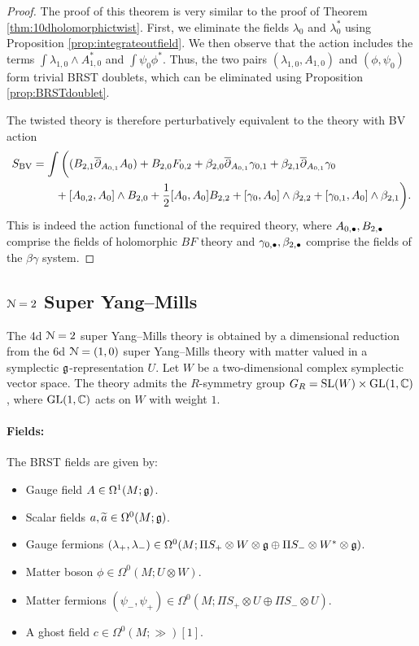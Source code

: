 \documentclass[10pt, oneside]{article}
\begin{document}
\begin{proof}
The proof of this theorem is very similar to the proof of Theorem \ref{thm:10dholomorphictwist}.  
First, we eliminate the fields $\lambda_0$ and $\lambda_0^*$ using Proposition \ref{prop:integrateoutfield}.  
We then observe that the action includes the terms $\int \lambda_{1,0} \wedge A_{1,0}^*$ and  $\int \psi_0\phi^*$. Thus, the two pairs $(\lambda_{1,0}, A_{1,0})$ and $(\phi, \psi_0)$ form trivial BRST doublets, which can be eliminated using Proposition \ref{prop:BRSTdoublet}.

The twisted theory is therefore perturbatively equivalent to the theory with BV action 
\begin{align*}
 S_{\mathrm{BV}} &= \int \bigg( (B_{2,1} \overline{\partial}_{A_{0,1}} A_{0})  + B_{2,0} F_{0,2} + \beta_{2,0} \overline{\partial}_{A_{0,1}} \gamma_{0,1} + \beta_{2,1} \overline{\partial}_{A_{0,1}} \gamma_0 \\ 
  &\qquad  + [A_{0,2}, A_0]\wedge B_{2,0} + \frac{1}{2}[A_0, A_0]B_{2,2} +  [\gamma_0, A_0]\wedge \beta_{2,2} + [\gamma_{0,1}, A_0]\wedge \beta_{2,1}  \bigg).
\end{align*}
This is indeed the action functional of the required theory, where $A_{0,\bullet}, B_{2,\bullet}$ comprise the fields of holomorphic $BF$ theory and $\gamma_{0,\bullet}, \beta_{2,\bullet}$ comprise the fields of the $\beta\gamma$ system.
\end{proof}

\subsection{\texorpdfstring{$\mathcal N=2$}{N=2} Super Yang--Mills} \label{4d_2_section}

The 4d $\mathcal N=2$ super Yang--Mills theory is obtained by a dimensional reduction from the 6d $\mathcal N=(1, 0)$ super Yang--Mills theory with matter valued in a symplectic $\mathfrak g$-representation $U$. Let $W$ be a two-dimensional complex symplectic vector space. The theory admits the $R$-symmetry group $G_R=\mathrm{SL}(W)\times \mathrm{GL}(1, \mathbb C)$, where $\mathrm{GL}(1, \mathbb C)$ acts on $W$ with weight $1$.

\vspace{-10pt}
\paragraph{Fields:} The BRST fields are given by:
\begin{itemize}
\item Gauge field $A \in \Omega^1(M; \mathfrak g)$.
\item Scalar fields $a, \widetilde{a}\in\Omega^0(M;\mathfrak g)$.
\item Gauge fermions $(\lambda_+, \lambda_-) \in \Omega^0(M; \Pi S_+ \otimes W\otimes \mathfrak g \oplus \Pi S_- \otimes W^*\otimes \mathfrak g)$.
\item Matter boson $\phi\in\Omega^0(M; U\otimes W)$.
\item Matter fermions $(\psi_-, \psi_+)\in\Omega^0(M; \Pi S_+\otimes U\oplus \Pi S_-\otimes U)$.
\item A ghost field $c\in \Omega^0(M; \gg)[1]$.
\end{itemize}
\end{document}
